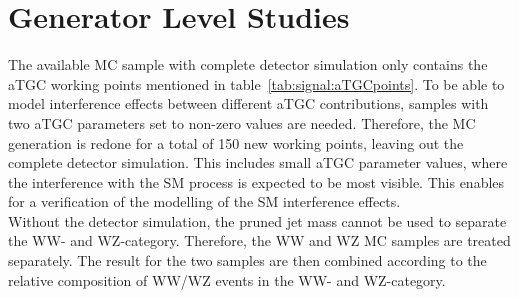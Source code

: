 \section{Generator Level Studies}
The available MC sample with complete detector simulation only contains the aTGC working points mentioned in table~\ref{tab:signal:aTGCpoints}. To be able to model interference effects between different aTGC contributions, samples with two aTGC parameters set to non-zero values are needed. Therefore, the MC generation is redone for a total of 150 new working points, leaving out the complete detector simulation. This includes small aTGC parameter values, where the interference with the SM process is expected to be most visible. This enables for a verification of the modelling of the SM interference effects.\\
Without the detector simulation, the pruned jet mass cannot be used to separate the WW- and WZ-category. Therefore, the WW and WZ MC samples are treated separately. The result for the two samples are then combined according to the relative composition of WW/WZ events in the WW- and WZ-category.  
